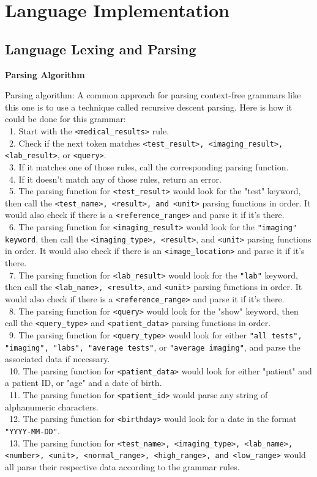 \chapter{Language Implementation}

\section{Language Lexing and Parsing}
\textbf{Parsing Algorithm}

Parsing algorithm: 
A common approach for parsing context-free grammars like this one is to use a technique called recursive descent parsing. Here is how it could be done for this grammar:
\\\	1. Start with the \texttt{<medical\_results>} rule.
\\\	2. Check if the next token matches \texttt{<test\_result>, <imaging\_result>, <lab\_result>}, or \texttt{<query>}.
\\\	3. If it matches one of those rules, call the corresponding parsing function.
\\\	4. If it doesn't match any of those rules, return an error.
\\\	5. The parsing function for \texttt{<test\_result>} would look for the "test" keyword, then call the \texttt{<test\_name>, <result>, and <unit>} parsing functions in order. It would also check if there is a \texttt{<reference\_range>} and parse it if it's there.
\\\	6. The parsing function for \texttt{<imaging\_result>} would look for the \texttt{"imaging" keyword}, then call the \texttt{<imaging\_type>, <result>}, and \texttt{<unit>} parsing functions in order. It would also check if there is an \texttt{<image\_location>} and parse it if it's there.
\\\	7. The parsing function for \texttt{<lab\_result>} would look for the \texttt{"lab"} keyword, then call the \texttt{<lab\_name>, <result>}, and \texttt{<unit>} parsing functions in order. It would also check if there is a \texttt{<reference\_range>} and parse it if it's there.
\\\	8. The parsing function for \texttt{<query>} would look for the "show" keyword, then call the \texttt{<query\_type>} and \texttt{<patient\_data>} parsing functions in order.
\\\	9. The parsing function for \texttt{<query\_type>} would look for either \texttt{"all tests", "imaging", "labs", "average tests"}, or \texttt{"average imaging"}, and parse the associated data if necessary.
\\\	10. The parsing function for \texttt{<patient\_data>} would look for either "patient" and a patient ID, or "age" and a date of birth.
\\\	11. The parsing function for \texttt{<patient\_id>} would parse any string of alphanumeric characters.
\\\	12. The parsing function for \texttt{<birthday>} would look for a date in the format \texttt{"YYYY-MM-DD"}.
\\\	13. The parsing function for \texttt{<test\_name>, <imaging\_type>, <lab\_name>, <number>, <unit>, <normal\_range>, <high\_range>, and <low\_range>} would all parse their respective data according to the grammar rules.

